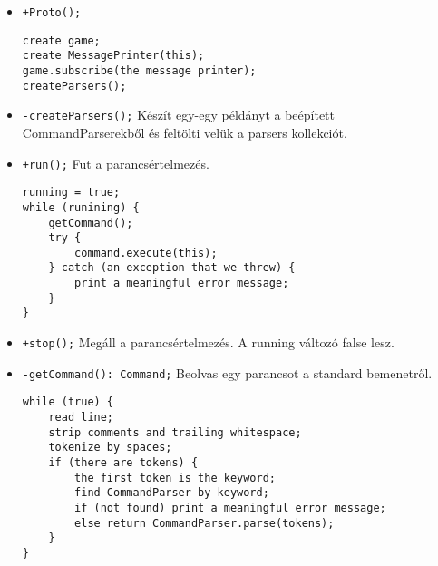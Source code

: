 \begin{itemize}
\begin{itemize}
		\item \texttt{+Proto();}
		\begin{lstlisting}
create game;
create MessagePrinter(this);
game.subscribe(the message printer);
createParsers();
		\end{lstlisting}
		\item \texttt{-createParsers();} \newline			
		Készít egy-egy példányt a beépített CommandParserekből és feltölti velük a parsers kollekciót.
		\item \texttt{+run();} \newline
		Fut a parancsértelmezés.
		\begin{lstlisting}
running = true;
while (runining) {
	getCommand();
	try {
		command.execute(this);
	} catch (an exception that we threw) {
		print a meaningful error message;
	}
}	
		\end{lstlisting}	
		\item \texttt{+stop();} \newline
		Megáll a parancsértelmezés. A running változó false lesz.
		\item \texttt{-getCommand(): Command;} \newline
		Beolvas egy parancsot a standard bemenetről.
		\begin{lstlisting}
while (true) {
	read line;
	strip comments and trailing whitespace;
	tokenize by spaces;
	if (there are tokens) {
		the first token is the keyword;
		find CommandParser by keyword;
		if (not found) print a meaningful error message;
		else return CommandParser.parse(tokens);
	}
}
		\end{lstlisting}	
		\end{itemize}
\end{itemize}

